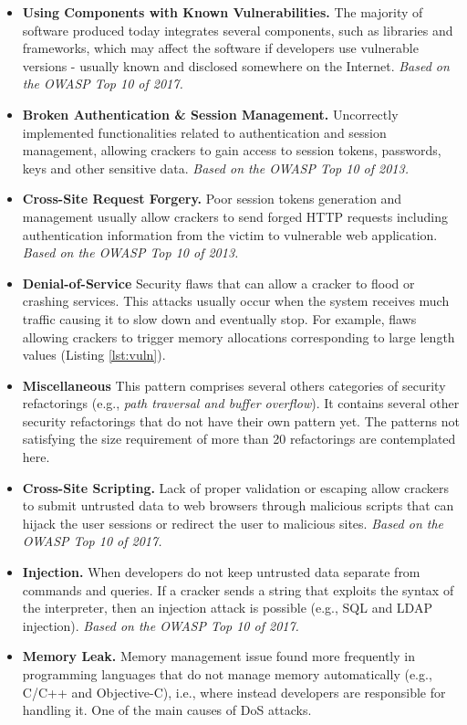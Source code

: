 \documentclass[10pt,conference]{IEEEtran}
\begin{document}
\begin{itemize}
	\item \textbf{Using Components with Known Vulnerabilities.} The majority of
	software produced today integrates several components, such as libraries and
	frameworks, which may affect the software if developers use vulnerable
	versions - usually known and disclosed somewhere on the Internet.
	\textit{Based on the OWASP Top 10 of 2017.}

	\item \textbf{Broken Authentication \& Session Management.} Uncorrectly
	implemented functionalities related to authentication and session management,
	allowing crackers to gain access to session tokens, passwords, keys and other
	sensitive data. \textit{Based on the OWASP Top 10 of 2013.}

	\item \textbf{Cross-Site Request Forgery.} Poor session tokens generation and
	management usually allow crackers to send forged HTTP requests including
	authentication information from the victim to vulnerable web application.
	\textit{Based on the OWASP Top 10 of 2013.}

	\item \textbf{Denial-of-Service} Security flaws that can allow a cracker to
	flood or crashing services. This attacks usually occur when the system
	receives much traffic causing it to slow down and eventually stop. For
	example, flaws allowing crackers to trigger memory allocations corresponding
	to large length values (Listing \ref{lst:vuln}).

	\item \textbf{Miscellaneous} This pattern comprises several others categories
	of security refactorings (e.g., \textit{path traversal and buffer overflow}).
	It contains several other security refactorings that do not have their own
	pattern yet. The patterns not satisfying the size requirement of more than 20
	refactorings are contemplated here.

	\item \textbf{Cross-Site Scripting.} Lack of proper validation or escaping
	allow crackers to submit untrusted data to web browsers through malicious
	scripts that can hijack the user sessions or redirect the user to malicious
	sites. \textit{Based on the OWASP Top 10 of 2017.}

	\item \textbf{Injection.} When developers do not keep untrusted data separate
	from commands and queries. If a cracker sends a string that exploits the
	syntax of the interpreter, then an injection attack is possible (e.g., SQL and
	LDAP injection). \textit{Based on the OWASP Top 10 of 2017.}

	\item \textbf{Memory Leak.} Memory management issue found more frequently in
	programming languages that do not manage memory automatically (e.g., C/C++ and
	Objective-C), i.e., where instead developers are responsible for handling it.
	One of the main causes of DoS attacks.
\end{itemize}
\end{document}
